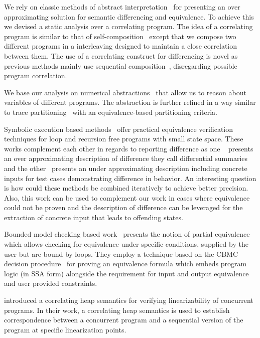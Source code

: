 We rely on classic methods of abstract interpretation~\cite{CousotCousot77} for presenting an over approximating solution for semantic differencing and equivalence. To achieve this we devised a static analysis over a correlating program. The idea of a correlating program is similar to that of self-composition~\cite{AikenTerauchi05} except that we compose two different programs in a interleaving designed to maintain a close correlation between them. The use of a correlating construct for differencing is novel as previous methods mainly use sequential composition~\cite{GodlinStrichman09, DwyerElbaumPerson08, EnglerRamos11}, disregarding possible program correlation.

We base our analysis on numerical abstractions~\cite{CousotHalbwachs78, Mine2006} that allow us to reason about variables of different programs. The abstraction is further refined in a way similar to trace partitioning~\cite{MauborgneRival07} with an equivalence-based partitioning criteria.

Symbolic execution based methods~\cite{DwyerElbaumPerson08, EnglerRamos11} offer practical equivalence verification techniques for loop and recursion free programs with small state space. These works complement each other in regards to reporting difference as one ~\cite{DwyerElbaumPerson08} presents an over approximating description of difference they call differential summaries and the other~\cite{EnglerRamos11} presents an under approximating description including concrete inputs for test cases demonstrating difference in behavior. An interesting question is how could these methods be combined iteratively to achieve better precision. Also, this work can be used to complement our work in cases where equivalence could not be proven and the description of difference can be leveraged for the extraction of concrete input that leads to offending states.

Bounded model checking based work~\cite{GodlinStrichman09} presents the notion of partial equivalence which allows checking for equivalence under specific conditions, supplied by the user but are bound by loops. They employ a technique based on the CBMC decision procedure~\cite{ClarkeKroeningYorav03} for proving an equivalence formula which embeds program logic (in SSA form) alongside the requirement for input and output equivalence and user provided constraints.

\cite{AmitRinetzkyRepsSagivYahav07} introduced a correlating heap semantics for verifying linearizability of concurrent programs. In their work, a correlating heap semantics is used to establish correspondence between a concurrent program and a sequential version of the program at specific linearization points.


